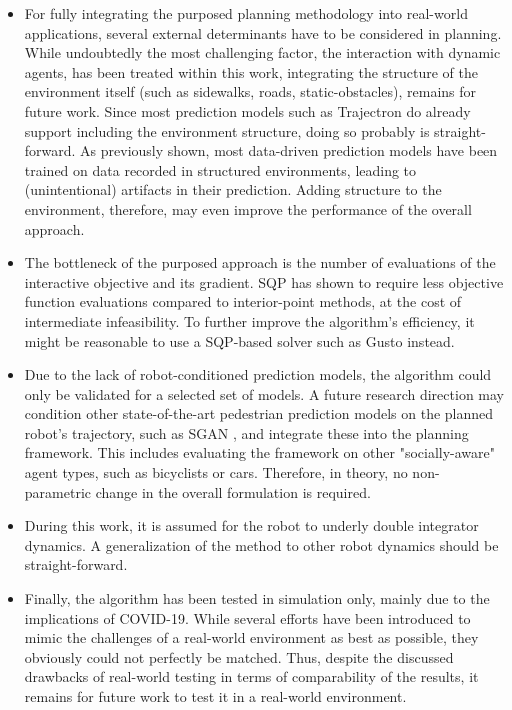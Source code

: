 \begin{itemize}
\item For fully integrating the purposed planning methodology into real-world applications, several external determinants have to be considered in planning. While undoubtedly the most challenging factor, the interaction with dynamic agents, has been treated within this work, integrating the structure of the environment itself (such as sidewalks, roads, static-obstacles), remains for future work. Since most prediction models such as Trajectron \cite{Salzmann2020} do already support including the environment structure, doing so probably is straight-forward. As previously shown, most data-driven prediction models have been trained on data recorded in structured environments, leading to (unintentional) artifacts in their prediction. Adding structure to the environment, therefore, may even improve the performance of the overall approach.
\item The bottleneck of the purposed approach is the number of evaluations of the interactive objective and its gradient. \ac{SQP} has shown to require less objective function evaluations compared to interior-point methods, at the cost of intermediate infeasibility. To further improve the algorithm's efficiency, it might be reasonable to use a \ac{SQP}-based solver such as Gusto \cite{Bonalli2019} instead.
\item Due to the lack of robot-conditioned prediction models, the algorithm could only be validated for a selected set of models. A future research direction may condition other state-of-the-art pedestrian prediction models on the planned robot's trajectory, such as \ac{SGAN} \cite{Gupta2018}, and integrate these into the planning framework. This includes evaluating the framework on other "socially-aware" agent types, such as bicyclists or cars. Therefore, in theory, no non-parametric change in the overall formulation is required.
\item During this work, it is assumed for the robot to underly double integrator dynamics. A generalization of the method to other robot dynamics should be straight-forward.
\item Finally, the algorithm has been tested in simulation only, mainly due to the implications of COVID-19. While several efforts have been introduced to mimic the challenges of a real-world environment as best as possible, they obviously could not perfectly be matched. Thus, despite the discussed drawbacks of real-world testing in terms of comparability of the results, it remains for future work to test it in a real-world environment. 
\end{itemize}

